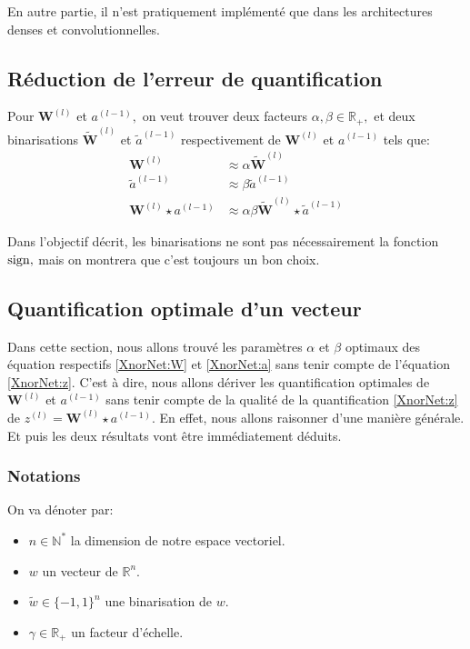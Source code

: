 En autre partie, il n'est pratiquement implémenté que dans les architectures denses et convolutionnelles.

\subsection{Réduction de l'erreur de quantification}
Pour $\boldsymbol{W}^{(l)}$ et $a^{(l-1)},$ on veut trouver deux facteurs $\alpha,\beta \in\mathbb{R}_+,$ et deux binarisations $\tilde{\boldsymbol{W}}^{(l)}$ et $\tilde{a}^{(l-1)}$ respectivement de $\boldsymbol{W}^{(l)}$ et $a^{(l-1)}$ tels que:
\begin{align}
	\boldsymbol{W}^{(l)} & \approx \alpha  \tilde{\boldsymbol{W}}^{(l)} \label{XnorNet:W}\\ 
	 \tilde{a}^{(l-1)} & \approx \beta  \tilde{a}^{(l-1)} \label{XnorNet:a}\\
	 \boldsymbol{W}^{(l)}\star a^{(l-1)} &\approx \alpha \beta  \tilde{\boldsymbol{W}}^{(l)}\star \tilde{a}^{(l-1)} \label{XnorNet:z}
\end{align}

Dans l'objectif décrit, les binarisations ne sont pas nécessairement la fonction $\operatorname{sign},$ mais on montrera que c'est toujours un bon choix.
\subsection{Quantification optimale d'un vecteur}\label{XnorNet:VectorQuantification}
Dans cette section, nous allons trouvé les paramètres $\alpha$ et $\beta$ optimaux des équation respectifs \eqref{XnorNet:W} et \eqref{XnorNet:a} sans tenir compte de l'équation \eqref{XnorNet:z}.
\newline C'est à dire, nous allons dériver les quantification optimales de $\boldsymbol{W}^{(l)}$ et $a^{(l-1)}$ sans tenir compte de la qualité de la quantification \eqref{XnorNet:z} de $z^{(l)}=\boldsymbol{W}^{(l)}\star a^{(l-1)}.$
\newline En effet, nous allons raisonner d'une manière générale. Et puis les deux résultats vont être immédiatement déduits.

\subsubsection{Notations}
On va dénoter par:
\begin{itemize}
	\item $n\in\mathbb{N}^*$ la dimension de notre espace vectoriel.
	\item  $w$ un vecteur de $\mathbb{R}^n.$
	\item $\tilde{w}\in \{-1,1\}^n$ une binarisation de $w.$
	\item $\gamma\in\mathbb{R}_+$ un facteur d'échelle.
\end{itemize}
